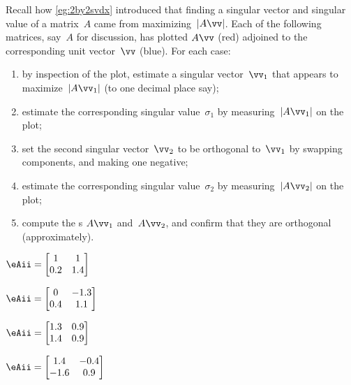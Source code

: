 \begin{exercise}  
Recall how \cref{eg:2by2svdx} introduced that finding a singular vector and singular value of a matrix~\(A\) came from maximizing~\(|A\vv|\).
Each of the following matrices, say~\(A\) for discussion, has plotted \(A\vv\) (red) adjoined to the corresponding unit vector~\(\vv\) (blue).
For each case:
\begin{enumerate}[label=\roman*.]
\item by inspection of the plot, estimate a singular vector~\(\vv_1\) that appears to maximize~\(|A\vv_1|\) (to one decimal place say);
\item estimate the corresponding singular value~\(\sigma_1\) by measuring~\(|A\vv_1|\) on the plot;
\item set the second singular vector~\(\vv_2\) to be orthogonal to~\(\vv_1\) by swapping components, and making one negative;
\item estimate the corresponding singular value~\(\sigma_2\) by measuring~\(|A\vv_2|\) on the plot;
\item compute the s \(A\vv_1\) and~\(A\vv_2\), and confirm that they are orthogonal (approximately).
\end{enumerate}

\def\eRosesize{small}
\begin{Parts}
\item \(\eAii=\begin{bmatrix} 1&1\\0.2&1.4 \end{bmatrix}\) 

\item \(\eAii=\begin{bmatrix} 0&-1.3\\0.4&1.1 \end{bmatrix}\) 

\item \(\eAii=\begin{bmatrix} 1.3&0.9\\1.4&0.9 \end{bmatrix}\) 

\item \(\eAii=\begin{bmatrix} 1.4&-0.4\\-1.6&0.9 \end{bmatrix}\) 

\end{Parts}
\end{exercise}






